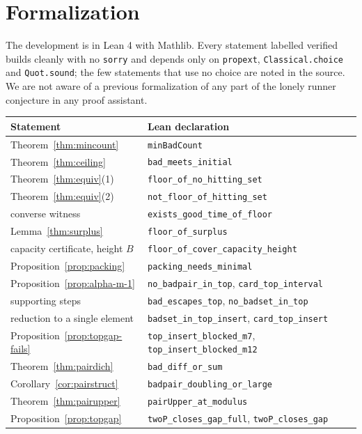 \documentclass[11pt]{amsart}
\theoremstyle{plain}
\theoremstyle{definition}
\begin{document}
\section{Formalization}\label{sec:lean}

The development is in Lean 4 with Mathlib. Every statement labelled verified builds cleanly with no
\texttt{sorry} and depends only on \texttt{propext}, \texttt{Classical.choice} and
\texttt{Quot.sound}; the few statements that use no choice are noted in the source. We are not aware
of a previous formalization of any part of the lonely runner conjecture in any proof assistant.

\begin{center}
\begin{tabular}{@{}ll@{}}
\toprule
Statement & Lean declaration \\
\midrule
Theorem~\ref{thm:mincount} & \texttt{minBadCount} \\
Theorem~\ref{thm:ceiling} & \texttt{bad\_meets\_initial} \\
Theorem~\ref{thm:equiv}(1) & \texttt{floor\_of\_no\_hitting\_set} \\
Theorem~\ref{thm:equiv}(2) & \texttt{not\_floor\_of\_hitting\_set} \\
converse witness & \texttt{exists\_good\_time\_of\_floor} \\
Lemma~\ref{thm:surplus} & \texttt{floor\_of\_surplus} \\
capacity certificate, height $B$ & \texttt{floor\_of\_cover\_capacity\_height} \\
Proposition~\ref{prop:packing} & \texttt{packing\_needs\_minimal} \\
Proposition~\ref{prop:alpha-m-1} & \texttt{no\_badpair\_in\_top}, \texttt{card\_top\_interval} \\
\quad supporting steps & \texttt{bad\_escapes\_top}, \texttt{no\_badset\_in\_top} \\
reduction to a single element & \texttt{badset\_in\_top\_insert}, \texttt{card\_top\_insert} \\
Proposition~\ref{prop:topgap-fails} & \texttt{top\_insert\_blocked\_m7}, \texttt{top\_insert\_blocked\_m12} \\
Theorem~\ref{thm:pairdich} & \texttt{bad\_diff\_or\_sum} \\
Corollary~\ref{cor:pairstruct} & \texttt{badpair\_doubling\_or\_large} \\
Theorem~\ref{thm:pairupper} & \texttt{pairUpper\_at\_modulus} \\
Proposition~\ref{prop:topgap} & \texttt{twoP\_closes\_gap\_full}, \texttt{twoP\_closes\_gap} \\

\end{tabular}
\end{center}
\end{document}
